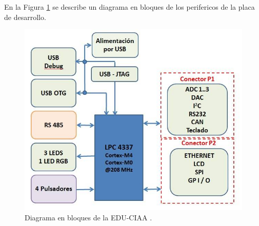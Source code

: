   
  
  
    
En la Figura \ref{fig:EDU_CIAA_esquema} se describe un diagrama en bloques de los perifericos de la placa de desarrollo.
\begin{figure}[H]
    \centering
    \includegraphics[width=0.55\linewidth]{Figuras/datalogger/Hardware/EDUCIAAesquema.png}
    \caption{Diagrama en bloques de la EDU-CIAA \cite{proyectoCIAA}.}
    \label{fig:EDU_CIAA_esquema}
\end{figure}

